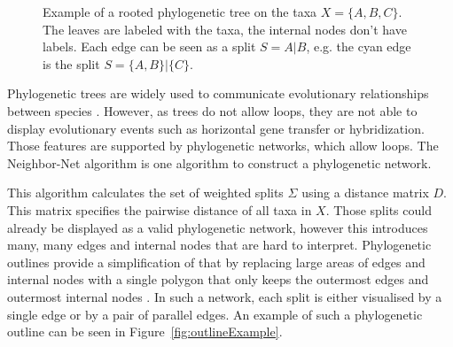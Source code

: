 \begin{figure}
  \centering
  \caption{Example of a rooted phylogenetic tree on the taxa $X = \{A, B, C\}$.
  The leaves are labeled with the taxa, the internal nodes don't have labels.
  Each edge can be seen as a split $S=A|B$, e.g. the cyan edge is the split $S =
  \{A, B\} | \{C\}$.}
  \label{fig:exampleTree}
\end{figure}

Phylogenetic trees are widely used to communicate evolutionary relationships
between species
\cite{mandalComparativeGenomeAnalysis2022,winkworthComparativeAnalysesComplete2022,ayala-usmaWholeGenomeDuplication2021}.
However, as trees do not allow loops, they are not able to display evolutionary
events such as horizontal gene transfer or hybridization. Those features are
supported by phylogenetic networks, which allow loops.  The
Neighbor-Net algorithm \cite{bryantNeighborNetAgglomerativeMethod2004} is one
algorithm to construct a phylogenetic network. 

This algorithm calculates the set of weighted splits $\Sigma$ using a distance
matrix $D$. This matrix specifies the pairwise distance of all taxa in $X$.
Those splits could already be displayed as a valid phylogenetic network, however
this introduces many, many edges and internal nodes that are hard to interpret.
Phylogenetic outlines provide a simplification of that by replacing large areas
of edges and internal nodes with a single polygon that only keeps the outermost
edges and outermost internal nodes \cite{bagciMicrobialPhylogeneticContext2021}.
In such a network, each split is either visualised by a single edge or by a pair
of parallel edges. An example of such a phylogenetic outline can be seen in
Figure~\ref{fig:outlineExample}. 

